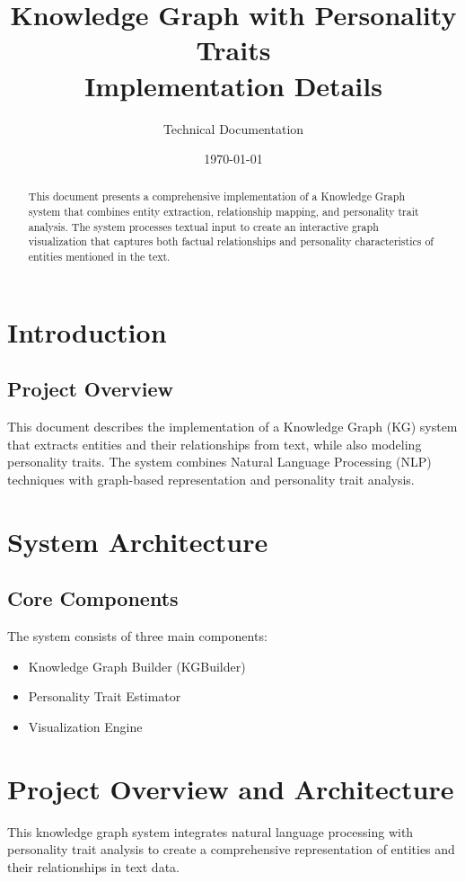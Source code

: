 \documentclass[11pt]{article}
\title{Knowledge Graph with Personality Traits\\Implementation Details}
\author{Technical Documentation}
\date{\today}
\begin{document}
\pagestyle{fancy}
\fancyhf{}

\maketitle

\begin{abstract}
This document presents a comprehensive implementation of a Knowledge Graph system that combines entity extraction, relationship mapping, and personality trait analysis. The system processes textual input to create an interactive graph visualization that captures both factual relationships and personality characteristics of entities mentioned in the text.
\end{abstract}

\tableofcontents
\newpage

\section{Introduction}
\subsection{Project Overview}
This document describes the implementation of a Knowledge Graph (KG) system that extracts entities and their relationships from text, while also modeling personality traits. The system combines Natural Language Processing (NLP) techniques with graph-based representation and personality trait analysis.

\section{System Architecture}

\subsection{Core Components}
The system consists of three main components:
\begin{itemize}
    \item Knowledge Graph Builder (KGBuilder)
    \item Personality Trait Estimator
    \item Visualization Engine
\end{itemize}

\section{Project Overview and Architecture}
This knowledge graph system integrates natural language processing with personality trait analysis to create a comprehensive representation of entities and their relationships in text data.
\end{document}
